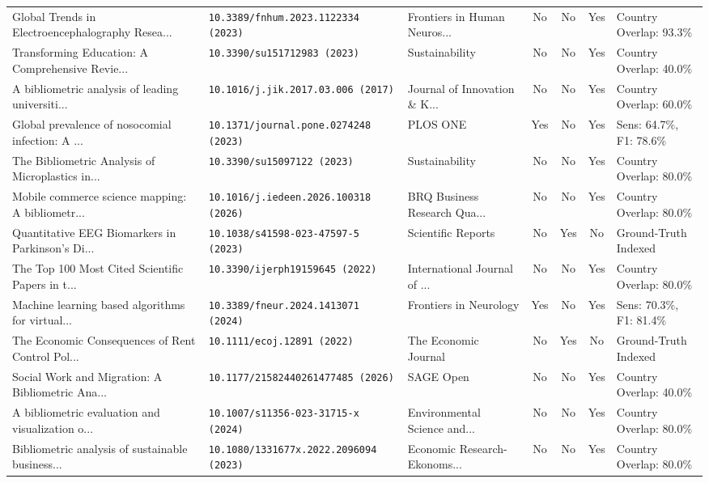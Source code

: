 \begin{table}[t]
{\begin{tabular}{p{4.5cm}p{3.2cm}p{3.2cm}cccp{3.0cm}}
Global Trends in Electroencephalography Resea... & {\footnotesize\nolinkurl{10.3389/fnhum.2023.1122334 (2023)}} & Frontiers in Human Neuros... & No & No & Yes & Country Overlap: 93.3\% \\
Transforming Education: A Comprehensive Revie... & {\footnotesize\nolinkurl{10.3390/su151712983 (2023)}} & Sustainability & No & No & Yes & Country Overlap: 40.0\% \\
A bibliometric analysis of leading universiti... & {\footnotesize\nolinkurl{10.1016/j.jik.2017.03.006 (2017)}} & Journal of Innovation \& K... & No & No & Yes & Country Overlap: 60.0\% \\
Global prevalence of nosocomial infection: A ... & {\footnotesize\nolinkurl{10.1371/journal.pone.0274248 (2023)}} & PLOS ONE & Yes & No & Yes & Sens: 64.7\%, F1: 78.6\% \\
The Bibliometric Analysis of Microplastics in... & {\footnotesize\nolinkurl{10.3390/su15097122 (2023)}} & Sustainability & No & No & Yes & Country Overlap: 80.0\% \\
Mobile commerce science mapping: A bibliometr... & {\footnotesize\nolinkurl{10.1016/j.iedeen.2026.100318 (2026)}} & BRQ Business Research Qua... & No & No & Yes & Country Overlap: 80.0\% \\
Quantitative EEG Biomarkers in Parkinson's Di... & {\footnotesize\nolinkurl{10.1038/s41598-023-47597-5 (2023)}} & Scientific Reports & No & Yes & No & Ground-Truth Indexed \\
The Top 100 Most Cited Scientific Papers in t... & {\footnotesize\nolinkurl{10.3390/ijerph19159645 (2022)}} & International Journal of ... & No & No & Yes & Country Overlap: 80.0\% \\
Machine learning based algorithms for virtual... & {\footnotesize\nolinkurl{10.3389/fneur.2024.1413071 (2024)}} & Frontiers in Neurology & Yes & No & Yes & Sens: 70.3\%, F1: 81.4\% \\
The Economic Consequences of Rent Control Pol... & {\footnotesize\nolinkurl{10.1111/ecoj.12891 (2022)}} & The Economic Journal & No & Yes & No & Ground-Truth Indexed \\
Social Work and Migration: A Bibliometric Ana... & {\footnotesize\nolinkurl{10.1177/21582440261477485 (2026)}} & SAGE Open & No & No & Yes & Country Overlap: 40.0\% \\
A bibliometric evaluation and visualization o... & {\footnotesize\nolinkurl{10.1007/s11356-023-31715-x (2024)}} & Environmental Science and... & No & No & Yes & Country Overlap: 80.0\% \\
Bibliometric analysis of sustainable business... & {\footnotesize\nolinkurl{10.1080/1331677x.2022.2096094 (2023)}} & Economic Research-Ekonoms... & No & No & Yes & Country Overlap: 80.0\% \\
\hline
\end{tabular}%
}
\end{table}
